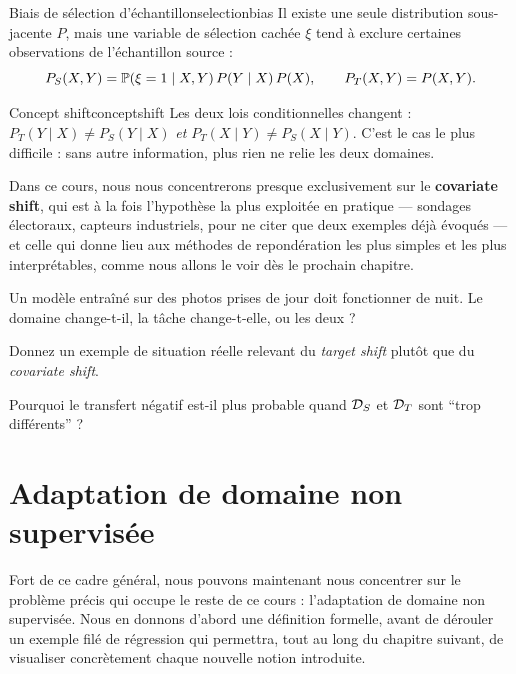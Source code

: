\documentclass[11pt]{article}
\begin{document}
\begin{definition}{Biais de sélection d'échantillon}{selectionbias}
Il existe une seule distribution sous-jacente $P$, mais une variable de sélection cachée $\xi$ tend à
exclure certaines observations de l'échantillon source :
\[
P_S(X,Y) = \P(\xi=1\mid X,Y)\,P(Y\mid X)\,P(X), \qquad P_T(X,Y) = P(X,Y).
\]
\end{definition}

\begin{definition}{Concept shift}{conceptshift}
Les deux lois conditionnelles changent : $P_T(Y\mid X)\neq P_S(Y\mid X)$ \emph{et} $P_T(X\mid Y)\neq
P_S(X\mid Y)$. C'est le cas le plus difficile : sans autre information, plus rien ne relie les deux
domaines.
\end{definition}

Dans ce cours, nous nous concentrerons presque exclusivement sur le \textbf{covariate shift}, qui est à
la fois l'hypothèse la plus exploitée en pratique --- sondages électoraux, capteurs industriels, pour ne
citer que deux exemples déjà évoqués --- et celle qui donne lieu aux méthodes de repondération les plus
simples et les plus interprétables, comme nous allons le voir dès le prochain chapitre.

\begin{quickchecks}
\item Un modèle entraîné sur des photos prises de jour doit fonctionner de nuit. Le domaine change-t-il,
la tâche change-t-elle, ou les deux ?
\item Donnez un exemple de situation réelle relevant du \emph{target shift} plutôt que du
\emph{covariate shift}.
\item Pourquoi le transfert négatif est-il plus probable quand $\D_S$ et $\D_T$ sont \enquote{trop
différents} ?
\end{quickchecks}

\section{Adaptation de domaine non supervisée}

Fort de ce cadre général, nous pouvons maintenant nous concentrer sur le problème précis qui occupe le
reste de ce cours : l'adaptation de domaine non supervisée. Nous en donnons d'abord une définition
formelle, avant de dérouler un exemple filé de régression qui permettra, tout au long du chapitre suivant,
de visualiser concrètement chaque nouvelle notion introduite.
\end{document}
